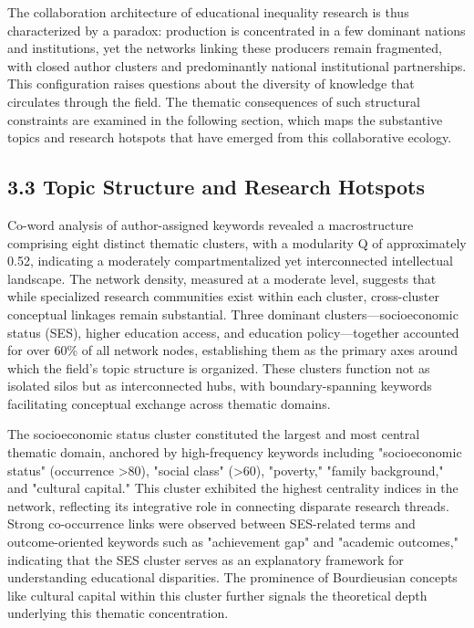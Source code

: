 \documentclass[12pt,a4paper]{article}
\begin{document}
The collaboration architecture of educational inequality research is thus characterized by a paradox: production is concentrated in a few dominant nations and institutions, yet the networks linking these producers remain fragmented, with closed author clusters and predominantly national institutional partnerships. This configuration raises questions about the diversity of knowledge that circulates through the field. The thematic consequences of such structural constraints are examined in the following section, which maps the substantive topics and research hotspots that have emerged from this collaborative ecology.

\subsection{3.3 Topic Structure and Research Hotspots}

Co-word analysis of author-assigned keywords revealed a macrostructure comprising eight distinct thematic clusters, with a modularity Q of approximately 0.52, indicating a moderately compartmentalized yet interconnected intellectual landscape. The network density, measured at a moderate level, suggests that while specialized research communities exist within each cluster, cross-cluster conceptual linkages remain substantial. Three dominant clusters—socioeconomic status (SES), higher education access, and education policy—together accounted for over 60\% of all network nodes, establishing them as the primary axes around which the field's topic structure is organized. These clusters function not as isolated silos but as interconnected hubs, with boundary-spanning keywords facilitating conceptual exchange across thematic domains.

The socioeconomic status cluster constituted the largest and most central thematic domain, anchored by high-frequency keywords including "socioeconomic status" (occurrence >80), "social class" (>60), "poverty," "family background," and "cultural capital." This cluster exhibited the highest centrality indices in the network, reflecting its integrative role in connecting disparate research threads. Strong co-occurrence links were observed between SES-related terms and outcome-oriented keywords such as "achievement gap" and "academic outcomes," indicating that the SES cluster serves as an explanatory framework for understanding educational disparities. The prominence of Bourdieusian concepts like cultural capital within this cluster further signals the theoretical depth underlying this thematic concentration.
\end{document}
